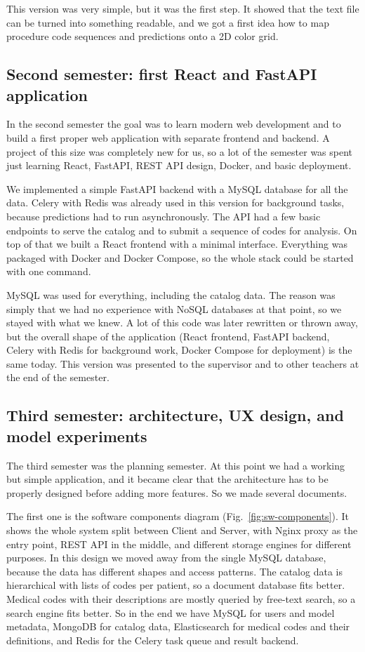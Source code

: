 This version was very simple, but it was the first step. It showed that the text file can be turned into something readable, and we got a first idea how to map procedure code sequences and predictions onto a 2D color grid.

\subsection{Second semester: first React and FastAPI application}
\label{sec:results-timeline-s2}

In the second semester the goal was to learn modern web development and to build a first proper web application with separate frontend and backend. A project of this size was completely new for us, so a lot of the semester was spent just learning React, FastAPI, REST API design, Docker, and basic deployment.

We implemented a simple FastAPI backend with a MySQL database for all the data. Celery with Redis was already used in this version for background tasks, because predictions had to run asynchronously. The API had a few basic endpoints to serve the catalog and to submit a sequence of codes for analysis. On top of that we built a React frontend with a minimal interface. Everything was packaged with Docker and Docker Compose, so the whole stack could be started with one command.

MySQL was used for everything, including the catalog data. The reason was simply that we had no experience with NoSQL databases at that point, so we stayed with what we knew. A lot of this code was later rewritten or thrown away, but the overall shape of the application (React frontend, FastAPI backend, Celery with Redis for background work, Docker Compose for deployment) is the same today. This version was presented to the supervisor and to other teachers at the end of the semester.

\subsection{Third semester: architecture, UX design, and model experiments}
\label{sec:results-timeline-s3}

The third semester was the planning semester. At this point we had a working but simple application, and it became clear that the architecture has to be properly designed before adding more features. So we made several documents.

The first one is the software components diagram (Fig.~\ref{fig:sw-components}). It shows the whole system split between Client and Server, with Nginx proxy as the entry point, REST API in the middle, and different storage engines for different purposes. In this design we moved away from the single MySQL database, because the data has different shapes and access patterns. The catalog data is hierarchical with lists of codes per patient, so a document database fits better. Medical codes with their descriptions are mostly queried by free-text search, so a search engine fits better. So in the end we have MySQL for users and model metadata, MongoDB for catalog data, Elasticsearch for medical codes and their definitions, and Redis for the Celery task queue and result backend.

